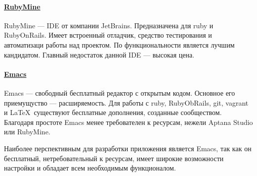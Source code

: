 \paragraph{\href{http://www.jetbrains.com/ruby/}{RubyMine}}

RubyMine --- IDE от компании JetBrains. Предназначена для ruby и RubyOnRails. Имеет встроенный отладчик, средство тестирования и автоматизаци работы над проектом. По функциональности является лучшим кандидатом. Главный недостаток данной IDE --- высокая цена.

\paragraph{\href{http://www.gnu.org/software/emacs/}{Emacs}}

Emacs --- свободный бесплатный редактор с открытым кодом. Основное его приемущуство --- расширяемость. Для работы с ruby, RubyObRails, git, vagrant и \LaTeX~существуют бесплатные дополнения, созданные сообществом. Благодаря простоте Emacs менее требователен к ресурсам, нежели Aptana Studio или RubyMine.

Наиболее перспективным для разработки приложения является Emacs, так как он бесплатный, нетребовательный к ресурсам, имеет широкие возможности настройки и обладает всем необходимым функционалом.
